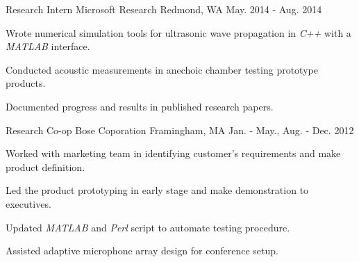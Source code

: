 \begin{cventries}
  \cventry
    {Research Intern} %
    {Microsoft Research} %
    {Redmond, WA} %
    {May. 2014 - Aug. 2014} %
    {
      \begin{cvitems} %
        \item {Wrote numerical simulation tools for ultrasonic wave propagation in \textit{C++} with a \textit{MATLAB} interface.}
        \item {Conducted acoustic measurements in anechoic chamber testing prototype products.}
        \item {Documented progress and results in published research papers.}
      \end{cvitems}
    }

  \cventry
    {Research Co-op} %
    {Bose Coporation} %
    {Framingham, MA} %
    {Jan. - May., Aug. - Dec. 2012} %
    {
      \begin{cvitems} %
        \item {Worked with marketing team in identifying customer's requirements and make product definition.}
        \item {Led the product prototyping in early stage and make demonstration to executives.}
        \item {Updated \textit{MATLAB} and \textit{Perl} script to automate testing procedure.}
        \item {Assisted adaptive microphone array design for conference setup.}
      \end{cvitems}
    }

\end{cventries}
